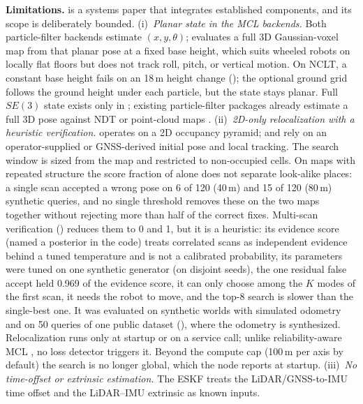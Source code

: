 \noindent\textbf{Limitations.} \sname{} is a systems paper that integrates established components, and its scope is deliberately bounded.
(i)~\emph{Planar state in the MCL backends.} Both particle-filter backends estimate $(x,y,\theta)$;  evaluates a full 3D Gaussian-voxel map from that planar pose at a fixed base height, which suits wheeled robots on locally flat floors but does not track roll, pitch, or vertical motion. On NCLT, a constant base height fails on an 18\,m height change (); the optional ground grid follows the ground height under each particle, but the state stays planar. Full $SE(3)$ state exists only in ; existing particle-filter packages already estimate a full 3D pose against NDT or point-cloud maps \citep{puga2024beluga,ekumen2022belugarepo,watanabe2016mcl3dl}.
(ii)~\emph{2D-only relocalization with a heuristic verification.}  operates on a 2D occupancy pyramid;  and  rely on an operator-supplied or GNSS-derived initial pose and local tracking. The search window is sized from the map and restricted to non-occupied cells. On maps with repeated structure the score fraction of  alone does not separate look-alike places: a single scan accepted a wrong pose on 6 of 120 (40\,m) and 15 of 120 (80\,m) synthetic queries, and no single threshold removes these on the two maps together without rejecting more than half of the correct fixes. Multi-scan verification () reduces them to 0 and 1, but it is a heuristic: its evidence score (named a posterior in the code) treats correlated scans as independent evidence behind a tuned temperature and is not a calibrated probability, its parameters were tuned on one synthetic generator (on disjoint seeds), the one residual false accept held 0.969 of the evidence score, it can only choose among the $K$ modes of the first scan, it needs the robot to move, and the top-8 search is slower than the single-best one. It was evaluated on synthetic worlds with simulated odometry and on 50 queries of one public dataset (), where the odometry is synthesized. Relocalization runs only at startup or on a service call; unlike reliability-aware MCL \citep{akai2023reliable}, no loss detector triggers it. Beyond the compute cap (100\,m per axis by default) the search is no longer global, which the node reports at startup.
(iii)~\emph{No time-offset or extrinsic estimation.} The ESKF treats the LiDAR/GNSS-to-IMU time offset and the LiDAR--IMU extrinsic as known inputs.
